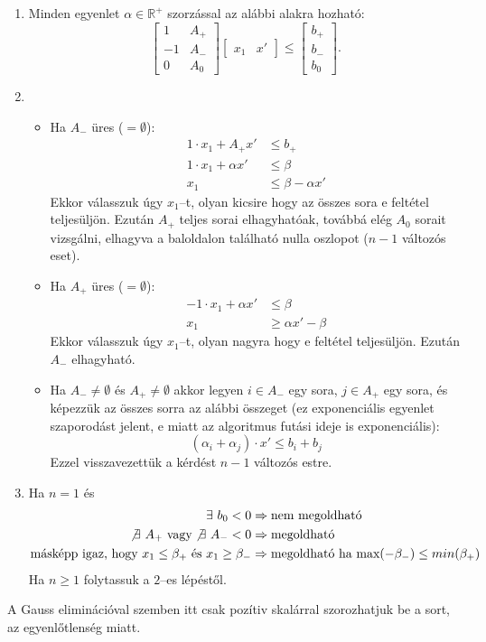 \begin{enumerate}
  \item Minden egyenlet $\alpha \in \mathbb{R}^+$ szorzással az alábbi alakra
  hozható:
  \begin{displaymath}
  \begin{bmatrix}
  1  & A_+ \\
  -1 & A_- \\
  0  & A_0
  \end{bmatrix}
  \begin{bmatrix}
  x_1 & 
  x'
  \end{bmatrix}
  \leq
  \begin{bmatrix}
  b_+ \\
  b_- \\
  b_0
  \end{bmatrix}.
  \end{displaymath}
  \item 
  \begin{itemize}
  	\item Ha $A_-$ üres ($=\emptyset$): 
  	\begin{align*}
  	1 \cdot x_1 + A_+ x'     &\leq b_+ \\
  	1 \cdot x_1 + \alpha x' &\leq \beta \\
  	x_1 			  &\leq \beta - \alpha x' 
  	\end{align*} 
    Ekkor válasszuk úgy $x_1$--t, olyan kicsire hogy az összes sora e feltétel
    teljesüljön. Ezután $A_+$ teljes sorai elhagyhatóak, továbbá elég $A_0$
    sorait vizsgálni, elhagyva a baloldalon található nulla oszlopot ($n-1$
    változós eset).
  	
  	\item Ha $A_+$ üres ($=\emptyset$): 
  	\begin{align*}
  	-1 \cdot x_1 + \alpha x'     &\leq \beta \\
  	x_1 			  &\geq \alpha x' - \beta 
  	\end{align*} 
  	Ekkor válasszuk úgy $x_1$--t, olyan nagyra hogy e feltétel teljesüljön.
  	Ezután $A_-$ elhagyható.
  	\item Ha $A_- \neq \emptyset$ és $A_+ \neq \emptyset$ akkor legyen 
  	$i \in A_-$ egy sora, $j \in A_+$ egy sora, és képezzük az összes sorra az
  	alábbi összeget (ez exponenciális egyenlet szaporodást jelent, e miatt az
  	algoritmus futási ideje is exponenciális):
  	\[
  	\left( \alpha_i + \alpha_j \right) \cdot x' \leq b_i + b_j 
  	\]
  	Ezzel visszavezettük a kérdést $n-1$ változós estre.
  \end{itemize}
 \item Ha $n=1$ és 
 \begin{align*}
 \exists~b_0 < 0 &\Rightarrow \mbox{nem megoldható} \\
 \not \exists~A_+ \mbox{ vagy} \not \exists~A_- < 0 &\Rightarrow \mbox{megoldható} \\
 \mbox{másképp igaz, hogy } x_1 \leq \beta_+ \mbox{ és } x_1 \geq \beta_-
 &\Rightarrow \mbox{megoldható ha } \mbox{max}(-\beta_-) \leq min(\beta_+)
 \end{align*} 
  Ha $n \geq 1$ folytassuk a $2$--es lépéstől.
\end{enumerate} 

A Gauss eliminációval szemben itt csak pozítiv skalárral szorozhatjuk be a sort,
az egyenlőtlenség miatt.